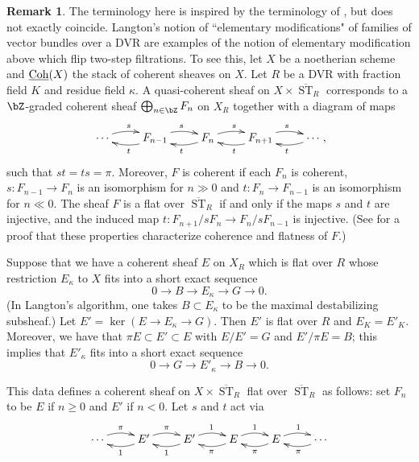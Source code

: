 \documentclass[a4paper]{amsart}
\numberwithin{equation}{section}
\theoremstyle{plain}
\theoremstyle{definition}
\newtheorem{remark}[thm]{Remark}
\DeclareMathOperator{\ST}{ST}
\newcommand{\uCoh}{\underline{{\rm Coh}}}
\newcommand{\co}{\colon}
\def\oST{\overline{\ST}}
\begin{document}
\begin{remark} \label{R:langton}
The terminology here is inspired by the terminology of \cite{langton}, but does not exactly coincide. Langton's notion of ``elementary modifications" of families of vector bundles over a DVR are examples of the notion of elementary modification above which flip two-step filtrations. 
To see this, let $X$ be a noetherian scheme and $\uCoh(X)$ the stack of coherent sheaves on $X$. Let $R$ be a DVR with fraction field $K$ and residue field $\kappa$. A quasi-coherent sheaf on $X \times \oST_R$ corresponds to a $\bZ$-graded coherent sheaf $\bigoplus_{n \in \bZ} F_n$ on $X_R$ together with a diagram of maps
  \begin{equation}%
\xymatrix{\cdots \ar@/^/[r]^s & F_{n-1} \ar@/^/[r]^s \ar@/^/[l]^t & F_{n} \ar@/^/[r]^s \ar@/^/[l]^t & F_{n+1}  \ar@/^/[r]^s \ar@/^/[l]^t & \ar@/^/[l]^t \cdots },
\end{equation}
such that $st=ts=\pi$.  Moreover, $F$ is coherent if each $F_n$ is coherent, $s \co F_{n-1} \to F_{n}$ is an isomorphism for $n \gg 0$ and $t \co F_n \to F_{n-1}$ is an isomorphism for $n \ll 0$.  The sheaf $F$ is a flat over $\oST_R$ if and only if the maps $s$ and $t$ are injective, and the induced map $t \co F_{n+1}/sF_n \to F_n / sF_{n-1}$ is injective. 
(See  for a proof that these properties characterize coherence and flatness of $F$.)

Suppose that we have a coherent sheaf $E$ on $X_R$ which is flat over $R$ whose restriction $E_\kappa$ to $X$ fits into a short exact sequence
\begin{equation} \label{E:exact1}
	0 \to B \to E_\kappa \to G \to 0.
\end{equation}
(In Langton's algorithm, one takes $B \subset E_\kappa$ to be the maximal destabilizing subsheaf.)
Let $E' = \ker(E \to E_\kappa \to G).$  Then $E'$ is flat over $R$ and $E_K = E'_K$.  Moreover, we have that $\pi E \subset E' \subset E$ with $E/E' = G$ and $E'/\pi E = B$; this implies that $E'_\kappa$ fits into a short exact sequence
\begin{equation} \label{E:exact2}
	0 \to G \to E'_\kappa \to B \to 0.
\end{equation}

This data defines a coherent sheaf on $X \times \oST_R$ flat over $\oST_R$ as follows: 
set $F_n$ to be $E$ if $n \ge 0$ and $E'$ if $n < 0$.  Let $s$ and $t$ act via
$$\xymatrix{
\cdots \ar@/^/[r]^{\pi} & 	 E' \ar@/^/[r]^{\pi} \ar@/^/[l]^1 & E' \ar@/^/[r]^{1} \ar@/^/[l]^1 & E \ar@/^/[r]^{1} \ar@/^/[l]^{\pi} & E \ar@/^/[r]^1 \ar@/^/[l]^{\pi} & \cdots \ar@/^/[l]^{\pi}
}$$


\end{remark}
\end{document}
